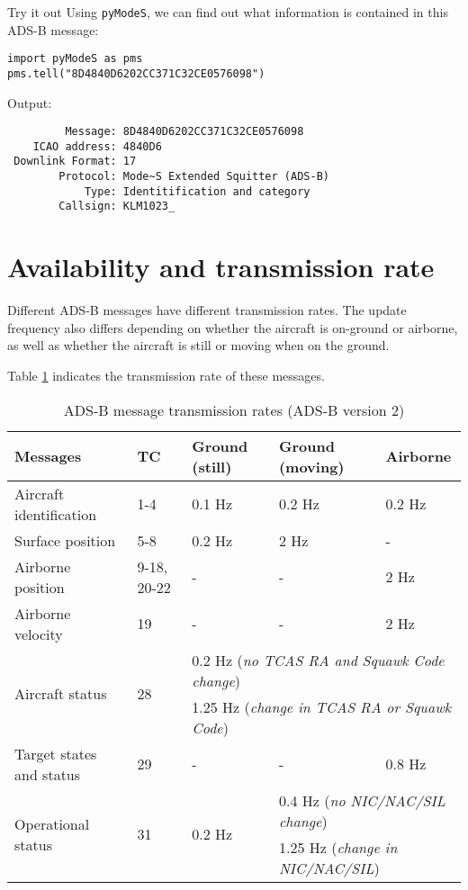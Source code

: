 \begin{notebox}{Try it out}
  Using \texttt{pyModeS}, we can find out what information is contained in this ADS-B message:

\begin{verbatim}
import pyModeS as pms
pms.tell("8D4840D6202CC371C32CE0576098")
\end{verbatim}

Output:

\begin{verbatim}
         Message: 8D4840D6202CC371C32CE0576098 
    ICAO address: 4840D6 
 Downlink Format: 17 
        Protocol: Mode~S Extended Squitter (ADS-B) 
            Type: Identitification and category 
        Callsign: KLM1023_ 
\end{verbatim}
  

\end{notebox}


\section{Availability and transmission rate}

Different ADS-B messages have different transmission rates. The update frequency also differs depending on whether the aircraft is on-ground or airborne, as well as whether the aircraft is still or moving when on the ground.

Table \ref{tb:adsb-transmission-rate} indicates the transmission rate of these messages.

\begin{table}[ht]
  \footnotesize
  \centering
  \caption{ADS-B message transmission rates (ADS-B version 2)}
  \label{tb:adsb-transmission-rate}
  \begin{tabular}{|l|l|l|l|l|}
  \hline
  \textbf{Messages} & \textbf{TC} & \textbf{Ground (still)} & \textbf{Ground (moving)} & \textbf{Airborne} \\ \hline
  Aircraft identification & 1-4 & 0.1 Hz & 0.2 Hz & 0.2 Hz \\ \hline
  Surface position & 5-8 & 0.2 Hz & 2 Hz & - \\ \hline
  Airborne position & 9-18, 20-22 & - & - & 2 Hz \\ \hline
  Airborne velocity & 19 & - & - & 2 Hz \\ \hline
  \multirow{2}{*}{Aircraft status} & \multirow{2}{*}{28} & \multicolumn{3}{l|}{0.2 Hz (\textit{no TCAS RA and Squawk Code change})} \\ \cline{3-5} 
   &  & \multicolumn{3}{l|}{1.25 Hz (\textit{change in TCAS RA or Squawk Code})} \\ \hline
  Target states and status & 29 & - & - & 0.8 Hz \\ \hline
  \multirow{2}{*}{Operational status} & \multirow{2}{*}{31} & \multirow{2}{*}{0.2 Hz} & \multicolumn{2}{l|}{0.4 Hz (\textit{no NIC/NAC/SIL change})} \\ \cline{4-5} 
   &  &  & \multicolumn{2}{l|}{1.25 Hz (\textit{change in NIC/NAC/SIL})} \\ \hline
  \end{tabular}
\end{table}

